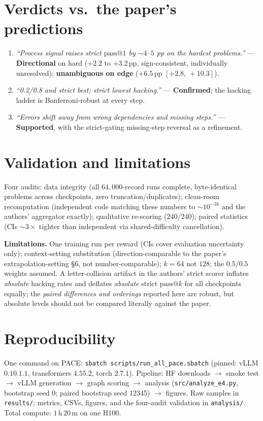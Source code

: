 \documentclass[11pt]{article}
\makeatletter
\newcommand{\passk}[1]{\ensuremath{\mathrm{pass}@#1}}
\newcommand{\pp}{\,\mathrm{pp}}
\newcommand{\ci}[2]{\ensuremath{[#1,\,#2]}}
\makeatother
\begin{document}
\section{Verdicts vs.\ the paper's predictions}
\begin{enumerate}[leftmargin=1.6em,itemsep=1pt]
\item \emph{``Process signal raises strict \passk{1} by ${\sim}4$--$5$ pp on the hardest
problems.''} --- \textbf{Directional} on hard ($+2.2$ to $+3.2\pp$, sign-consistent,
individually unresolved); \textbf{unambiguous on edge} ($+6.5\pp$ \ci{+2.8}{+10.3}).
\item \emph{``0.2/0.8 and strict best; strict lowest hacking.''} --- \textbf{Confirmed};
the hacking ladder is Bonferroni-robust at every step.
\item \emph{``Errors shift away from wrong dependencies and missing steps.''} ---
\textbf{Supported}, with the strict-gating missing-step reversal as a refinement.
\end{enumerate}

\section{Validation and limitations}
Four audits: data integrity (all $64{,}000$-record runs complete, byte-identical
problems across checkpoints, zero truncation/duplicates); clean-room recomputation
(independent code matching these numbers to ${\sim}10^{-16}$ and the authors' aggregator
exactly); qualitative re-scoring ($240/240$); paired statistics (CIs ${\sim}3\times$
tighter than independent via shared-difficulty cancellation).

\noindent\textbf{Limitations.} One training run per reward (CIs cover evaluation
uncertainty only); context-setting substitution (direction-comparable to the paper's
extrapolation-setting \S6, not number-comparable); $k{=}64$ not $128$; the $0.5/0.5$
weights assumed. A letter-collision artifact in the authors' strict scorer inflates
\emph{absolute} hacking rates and deflates \emph{absolute} strict \passk{k} for all
checkpoints equally; the \emph{paired differences and orderings} reported here are
robust, but absolute levels should not be compared literally against the paper.

\section{Reproducibility}
One command on PACE: \texttt{sbatch scripts/run\_all\_pace.sbatch} (pinned: vLLM
$0.10.1.1$, transformers $4.55.2$, torch $2.7.1$). Pipeline: HF downloads
$\to$ smoke test $\to$ vLLM generation $\to$ graph scoring $\to$ analysis
(\texttt{src/analyze\_e4.py}, bootstrap seed 0; paired bootstrap seed 12345)
$\to$ figures. Raw samples in \texttt{results/}; metrics, CSVs, figures, and the
four-audit validation in \texttt{analysis/}. Total compute: $1$\,h\,$20$\,m on one H100.
\end{document}
